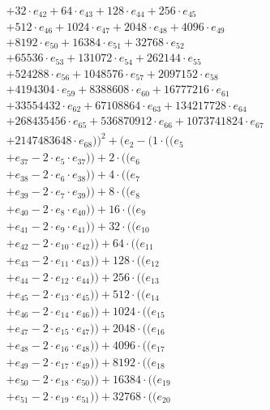 \documentclass[10pt, a4paper]{article}
\begin{document}
\begin{align*}
& + 32 \cdot e_{42} + 64 \cdot e_{43} + 128 \cdot e_{44} + 256 \cdot e_{45} \\
& + 512 \cdot e_{46} + 1024 \cdot e_{47} + 2048 \cdot e_{48} + 4096 \cdot e_{49} \\
& + 8192 \cdot e_{50} + 16384 \cdot e_{51} + 32768 \cdot e_{52} \\
& + 65536 \cdot e_{53} + 131072 \cdot e_{54} + 262144 \cdot e_{55} \\
& + 524288 \cdot e_{56} + 1048576 \cdot e_{57} + 2097152 \cdot e_{58} \\
& + 4194304 \cdot e_{59} + 8388608 \cdot e_{60} + 16777216 \cdot e_{61} \\
& + 33554432 \cdot e_{62} + 67108864 \cdot e_{63} + 134217728 \cdot e_{64} \\
& + 268435456 \cdot e_{65} + 536870912 \cdot e_{66} + 1073741824 \cdot e_{67} \\
& + 2147483648 \cdot e_{68}))^{2} + (e_{2} - (1 \cdot ((e_{5} \\
& + e_{37} - 2 \cdot e_{5} \cdot e_{37})) + 2 \cdot ((e_{6} \\
& + e_{38} - 2 \cdot e_{6} \cdot e_{38})) + 4 \cdot ((e_{7} \\
& + e_{39} - 2 \cdot e_{7} \cdot e_{39})) + 8 \cdot ((e_{8} \\
& + e_{40} - 2 \cdot e_{8} \cdot e_{40})) + 16 \cdot ((e_{9} \\
& + e_{41} - 2 \cdot e_{9} \cdot e_{41})) + 32 \cdot ((e_{10} \\
& + e_{42} - 2 \cdot e_{10} \cdot e_{42})) + 64 \cdot ((e_{11} \\
& + e_{43} - 2 \cdot e_{11} \cdot e_{43})) + 128 \cdot ((e_{12} \\
& + e_{44} - 2 \cdot e_{12} \cdot e_{44})) + 256 \cdot ((e_{13} \\
& + e_{45} - 2 \cdot e_{13} \cdot e_{45})) + 512 \cdot ((e_{14} \\
& + e_{46} - 2 \cdot e_{14} \cdot e_{46})) + 1024 \cdot ((e_{15} \\
& + e_{47} - 2 \cdot e_{15} \cdot e_{47})) + 2048 \cdot ((e_{16} \\
& + e_{48} - 2 \cdot e_{16} \cdot e_{48})) + 4096 \cdot ((e_{17} \\
& + e_{49} - 2 \cdot e_{17} \cdot e_{49})) + 8192 \cdot ((e_{18} \\
& + e_{50} - 2 \cdot e_{18} \cdot e_{50})) + 16384 \cdot ((e_{19} \\
& + e_{51} - 2 \cdot e_{19} \cdot e_{51})) + 32768 \cdot ((e_{20} \\

\end{align*}
\end{document}
